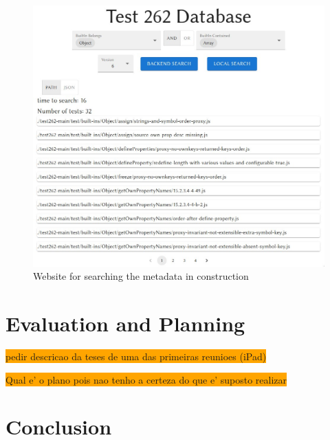 \documentclass[runningheads]{llncs}
\begin{document}
\begin{figure}[ht]
    \centering
    \includegraphics[width=1\textwidth]{images/website.png}
    \caption{Website for searching the metadata in construction}
    \label{fig:website}
\end{figure}

\section{Evaluation and Planning}
\label{sec:Evaluation and Planning}
\colorbox{orange}{pedir descricao da teses de uma das primeiras reunioes (iPad)}

\colorbox{orange}{Qual e' o plano pois nao tenho a certeza do que e' suposto realizar}

\section{Conclusion}
\label{sec:Conclusion}


%
%

%
%
%
% 
% 
%


\end{document}
